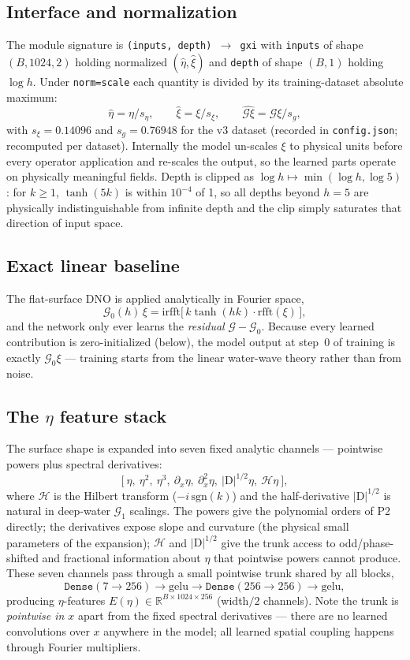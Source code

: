 \documentclass[11pt,letterpaper]{article}
\newcommand{\Gop}{\mathcal{G}}
\newcommand{\Hil}{\mathcal{H}}
\newcommand{\D}{\mathrm{D}}
\begin{document}
\subsection{Interface and normalization}

The module signature is \texttt{(inputs, depth) $\to$ gxi} with
\texttt{inputs} of shape $(B, 1024, 2)$ holding normalized $(\hat\eta, \hat\xi)$
and \texttt{depth} of shape $(B,1)$ holding $\log h$. Under \texttt{norm=scale}
each quantity is divided by its training-dataset absolute maximum:
\[
\hat\eta = \eta / s_\eta, \qquad
\hat\xi  = \xi  / s_\xi, \qquad
\widehat{\Gop\xi} = \Gop\xi / s_g,
\]
with $s_\xi = 0.14096$ and $s_g = 0.76948$ for the v3 dataset (recorded in
\texttt{config.json}; recomputed per dataset). Internally the model un-scales
$\xi$ to physical units before every operator application and re-scales the
output, so the learned parts operate on physically meaningful fields. Depth is
clipped as $\log h \mapsto \min(\log h, \log 5)$: for $k \ge 1$,
$\tanh(5k)$ is within $10^{-4}$ of 1, so all depths beyond $h=5$ are physically
indistinguishable from infinite depth and the clip simply saturates that
direction of input space.

\subsection{Exact linear baseline}

The flat-surface DNO is applied analytically in Fourier space,
\[
\Gop_0(h)\,\xi = \mathrm{irfft}\bigl[\,k\tanh(hk)\cdot \mathrm{rfft}(\xi)\,\bigr],
\]
and the network only ever learns the \emph{residual} $\Gop - \Gop_0$. Because
every learned contribution is zero-initialized (below), the model output at
step~0 of training is exactly $\Gop_0\xi$ --- training starts from the linear
water-wave theory rather than from noise.

\subsection{The $\eta$ feature stack}

The surface shape is expanded into seven fixed analytic channels --- pointwise
powers plus spectral derivatives:
\[
\bigl[\ \eta,\ \eta^2,\ \eta^3,\ \partial_x\eta,\ \partial_x^2\eta,\ |\D|^{1/2}\eta,\ \Hil\eta\ \bigr],
\]
where $\Hil$ is the Hilbert transform ($-i\,\mathrm{sgn}(k)$) and the
half-derivative $|\D|^{1/2}$ is natural in deep-water $\Gop_1$ scalings. The
powers give the polynomial orders of P2 directly; the derivatives expose slope
and curvature (the physical small parameters of the expansion); $\Hil$ and
$|\D|^{1/2}$ give the trunk access to odd/phase-shifted and fractional
information about $\eta$ that pointwise powers cannot produce. These seven
channels pass through a small pointwise trunk shared by all blocks,
\[
\texttt{Dense}(7 \to 256) \to \mathrm{gelu} \to \texttt{Dense}(256 \to 256) \to \mathrm{gelu},
\]
producing $\eta$-features $E(\eta) \in \mathbb{R}^{B \times 1024 \times 256}$
(width$/2$ channels). Note the trunk is \emph{pointwise in $x$} apart from the
fixed spectral derivatives --- there are no learned convolutions over $x$
anywhere in the model; all learned spatial coupling happens through Fourier
multipliers.
\end{document}
